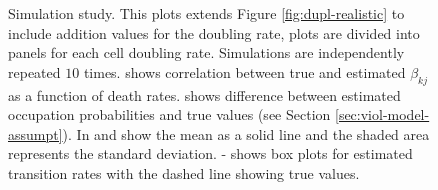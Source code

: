 \clearpage
\thispagestyle{empty}
\begin{figure}
  \ContinuedFloat
  \centering
  \caption{Simulation study. This plots extends Figure \ref{fig:dupl-realistic} to include addition values for the doubling rate, plots are divided into panels for each cell doubling rate. Simulations are independently repeated $10$ times.  shows correlation between true and estimated $\beta_{kj}$ as a function of death rates.  shows difference between estimated occupation probabilities and true values (see Section \ref{sec:viol-model-assumpt}). In  and  show the mean as a solid line and the shaded area represents the standard deviation.  -  shows box plots for estimated transition rates with the dashed line showing true values.}
  \label{fig:dupl-all}
\end{figure}
\clearpage

